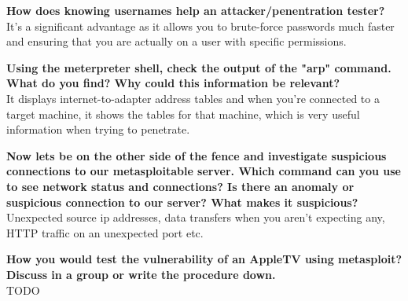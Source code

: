 \textbf{\dag How does knowing usernames help an attacker/penentration tester?}\\
It's a significant advantage as it allows you to brute-force passwords much faster and ensuring that you are actually on a user with specific permissions.

\textbf{\dag Using the meterpreter shell, check the output of the "arp" command. What do you find? Why could this information be relevant?
}\\
It displays internet-to-adapter address tables and when you're connected to a target machine, it shows the tables for that machine, which is very useful information when trying to penetrate.

\textbf{\dag Now lets be on the other side of the fence and investigate suspicious connections to our metasploitable server. Which command can you use to see network status and connections? Is there an anomaly or suspicious connection to our server? What makes it suspicious?}\\
Unexpected source ip addresses, data transfers when you aren't expecting any, HTTP traffic on an unexpected port etc.

\textbf{How you would test the vulnerability of an AppleTV using metasploit?Discuss in a group or write the procedure down.}\\
TODO
